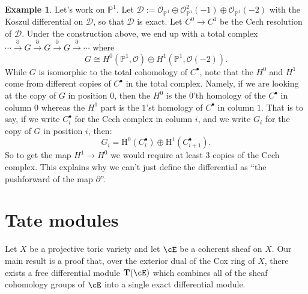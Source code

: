 \documentclass[12pt]{amsart}
\theoremstyle{definition}
\newtheorem{example}[lemma]{Example}
\theoremstyle{remark}
\newcommand{\Tate}{{\mathbf{T}}}
\newcommand{\PP}{\mathbb P}
\newcommand{\HH}{\mathrm H}
\newcommand{\Pic}{\operatorname{Pic}}
\newcommand{\cO}{{\mathcal O}}
\newcommand{\daniel}[1]{{\color{blue} \sf $\clubsuit\clubsuit\clubsuit$ Daniel: [#1]}}
\begin{document}
\begin{example}
Let's work on $\PP^1$.  Let $\mathcal D:= \cO_{\PP^1}\oplus \cO_{\PP^1}^2(-1) \oplus \cO_{\PP^1}(-2)$ with the Koszul differential on $\mathcal D$, so that $\mathcal D$ is exact.  Let $C^0\to C^1$ be the Cech resolution of $\mathcal D$. Under the construction above, we end up with a total complex
$
\cdots \overset{\partial}{\longrightarrow} G \overset{\partial}{\longrightarrow} G \overset{\partial}{\longrightarrow}G \overset{\partial}{\longrightarrow} \cdots
$
where
\[
G\cong H^0(\PP^1,\cO) \oplus H^1(\PP^1,\cO(-2)).
\]
While $G$ is isomorphic to the total cohomology of $C^\bullet$, note that the $H^0$ and $H^1$ come from different copies of $C^\bullet$ in the total complex.  Namely, if we are looking at the copy of $G$ in position $0$, then the $H^0$ is the $0$'th homology of the $C^\bullet$ in column $0$ whereas the $H^1$ part is the $1$'st homology of $C^\bullet$ in column $1$.  That is to say, if we write $C^\bullet_i$ for the Cech complex in column $i$, and we write $G_i$ for the copy of $G$ in position $i$, then:
\[
G_i = \HH^0(C^\bullet_i)\oplus  \HH^1(C^\bullet_{i+1}).
\]
So to get the map $H^1\to H^0$ we would require at least $3$ copies of the Cech complex.  This explains why we can't just define the differential as ``the pushforward of the map $\partial$''.
\end{example}


\section{Tate modules}
Let $X$ be a projective toric variety and let $\cE$ be a coherent sheaf on $X$.  Our main result is a proof that, over the exterior dual of the Cox ring of $X$, there exists a free differential module $\Tate(\cE)$ which combines all of the sheaf cohomology groups of $\cE$ into a single exact differential module.  

\end{document}
